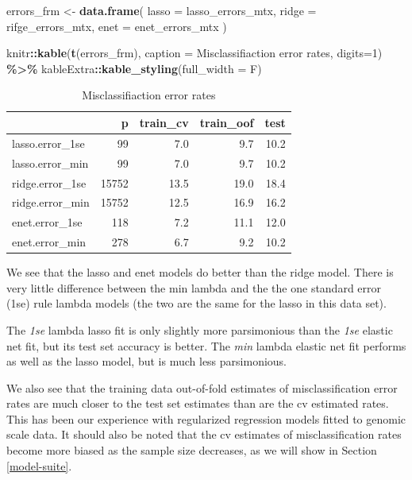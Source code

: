 \documentclass[
]{book}
\newenvironment{Shaded}{\begin{snugshade}}{\end{snugshade}}
\newcommand{\DataTypeTok}[1]{\textcolor[rgb]{0.13,0.29,0.53}{#1}}
\newcommand{\DecValTok}[1]{\textcolor[rgb]{0.00,0.00,0.81}{#1}}
\newcommand{\KeywordTok}[1]{\textcolor[rgb]{0.13,0.29,0.53}{\textbf{#1}}}
\newcommand{\NormalTok}[1]{#1}
\newcommand{\OperatorTok}[1]{\textcolor[rgb]{0.81,0.36,0.00}{\textbf{#1}}}
\newcommand{\StringTok}[1]{\textcolor[rgb]{0.31,0.60,0.02}{#1}}
\begin{document}
\begin{Shaded}
\begin{Highlighting}[]
\NormalTok{errors\_frm <{-}}\StringTok{ }\KeywordTok{data.frame}\NormalTok{(}
  \DataTypeTok{lasso =}\NormalTok{ lasso\_errors\_mtx, }\DataTypeTok{ridge =}\NormalTok{ rifge\_errors\_mtx, }\DataTypeTok{enet =}\NormalTok{ enet\_errors\_mtx}
\NormalTok{)}

\NormalTok{knitr}\OperatorTok{::}\KeywordTok{kable}\NormalTok{(}\KeywordTok{t}\NormalTok{(errors\_frm),}
 \DataTypeTok{caption =} \StringTok{\textquotesingle{}Misclassifiaction error rates\textquotesingle{}}\NormalTok{,}
 \DataTypeTok{digits=}\DecValTok{1}\NormalTok{) }\OperatorTok{\%>\%}\StringTok{ }
\StringTok{  }\NormalTok{kableExtra}\OperatorTok{::}\KeywordTok{kable\_styling}\NormalTok{(}\DataTypeTok{full\_width =}\NormalTok{ F)}
\end{Highlighting}
\end{Shaded}

\begin{table}

\caption{\label{tab:printErrors}Misclassifiaction error rates}
\centering
\begin{tabular}[t]{l|r|r|r|r}
\hline
  & p & train\_cv & train\_oof & test\\
\hline
lasso.error\_1se & 99 & 7.0 & 9.7 & 10.2\\
\hline
lasso.error\_min & 99 & 7.0 & 9.7 & 10.2\\
\hline
ridge.error\_1se & 15752 & 13.5 & 19.0 & 18.4\\
\hline
ridge.error\_min & 15752 & 12.5 & 16.9 & 16.2\\
\hline
enet.error\_1se & 118 & 7.2 & 11.1 & 12.0\\
\hline
enet.error\_min & 278 & 6.7 & 9.2 & 10.2\\
\hline
\end{tabular}
\end{table}

We see that the lasso and enet models do better than the ridge model.
There is very little difference between the min lambda and the
the one standard error (1se) rule lambda models (the two are the same for the
lasso in this data set).

The \emph{1se} lambda lasso fit is only slightly more parsimonious than the
\emph{1se} elastic net fit, but its test set accuracy is better.
The \emph{min} lambda elastic net fit performs as well as the lasso model,
but is much less parsimonious.

We also see that the training data out-of-fold
estimates of misclassification error rates are much closer to the
test set estimates than are the cv estimated rates. This has
been our experience with regularized regression models fitted to
genomic scale data. It should also be noted that the cv estimates of
misclassification rates become more biased as the sample size decreases,
as we will show in Section \ref{model-suite}.
\end{document}
